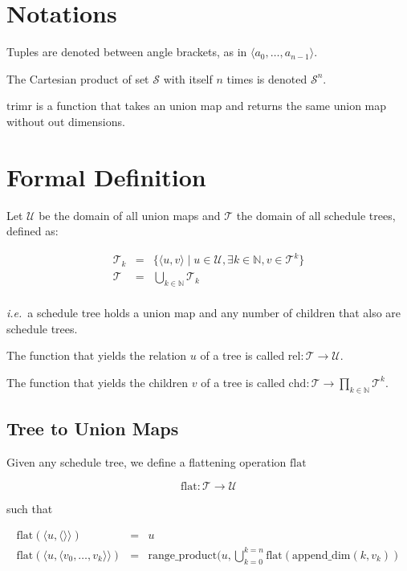 \documentclass{article}
\begin{document}
\section*{Notations}

Tuples are denoted between angle brackets, as in $\langle a_0, \ldots,
a_{n-1}\rangle$.

The Cartesian product of set $\mathcal{S}$ with itself $n$ times is denoted
$\mathcal{S}^n$.

$\mathrm{trimr}$ is a function that takes an union map and returns the same union map without out dimensions.

\section{Formal Definition}


Let $\mathcal{U}$ be the domain of all union maps and $\mathcal{T}$ the domain
of all schedule trees, defined as:

\[
    \begin{array}{lcl}
        \mathcal{T}_k &=& \{ \langle u, v\rangle \mid u \in \mathcal{U}, \exists k\in\mathbb{N}, v \in \mathcal{T}^k \} \\
        \mathcal{T} &=& \displaystyle\bigcup_{k\in\mathbb{N}} \mathcal{T}_k\\
    \end{array}
\]

\noindent \emph{i.e.}\ a schedule tree holds a union map and any number of children that also are schedule trees.

The function that yields the relation $u$ of a tree is called $\mathrm{rel}:\mathcal{T} \rightarrow \mathcal{U}$.

The function that yields the children $v$ of a tree is called $\mathrm{chd}:\mathcal{T} \rightarrow \displaystyle\prod_{k\in\mathbb{N}}\mathcal{T}^k$.

\subsection{Tree to Union Maps}

Given any schedule tree, we define a flattening operation $\mathrm{flat}$

\[
    \mathrm{flat}: \mathcal{T} \rightarrow \mathcal{U}
\]

\noindent such that

\[
    \begin{array}{lcl}
        \mathrm{flat}(\langle u, \langle\rangle \rangle) &=& u \\
        \mathrm{flat}(\langle u, \langle v_0, \ldots, v_k\rangle \rangle) &=& \mathrm{range\_product}(u, \bigcup_{k=0}^{k=n} \mathrm{flat}(\mathrm{append\_dim}(k, v_k)) \\
    \end{array}
\]
\end{document}
